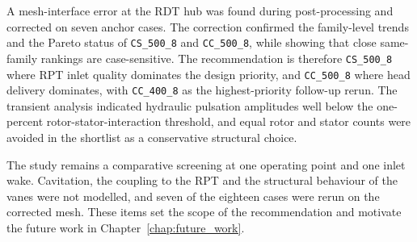 A mesh-interface error at the RDT hub was found during post-processing and corrected on seven anchor cases. The correction confirmed the family-level trends and the Pareto status of \texttt{CS\_500\_8} and \texttt{CC\_500\_8}, while showing that close same-family rankings are case-sensitive. The recommendation is therefore \texttt{CS\_500\_8} where RPT inlet quality dominates the design priority, and \texttt{CC\_500\_8} where head delivery dominates, with \texttt{CC\_400\_8} as the highest-priority follow-up rerun. The transient analysis indicated hydraulic pulsation amplitudes well below the one-percent rotor-stator-interaction threshold, and equal rotor and stator counts were avoided in the shortlist as a conservative structural choice.

The study remains a comparative screening at one operating point and one inlet wake. Cavitation, the coupling to the RPT and the structural behaviour of the vanes were not modelled, and seven of the eighteen cases were rerun on the corrected mesh. These items set the scope of the recommendation and motivate the future work in Chapter~\ref{chap:future_work}.

\clearpage %